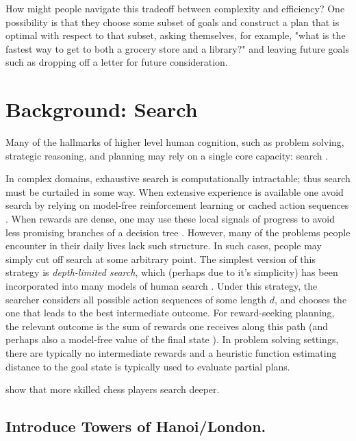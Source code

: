 \documentclass[10pt,letterpaper]{article}
\begin{document}
How might people navigate this tradeoff between complexity and efficiency? One possibility is that they choose some subset of goals and construct a plan that is optimal with respect to that subset, asking themselves, for example, "what is the fastest way to get to both a grocery store and a library?" and leaving future goals such as dropping off a letter for future consideration.




\section{Background: Search}

Many of the hallmarks of higher level human cognition, such as problem solving, strategic reasoning, and planning may rely on a single core capacity: search \cite{NewellSimon1972}.

In complex domains, exhaustive search is computationally intractable; thus search must be curtailed in some way. When extensive experience is available one avoid search by relying on model-free reinforcement learning \citep{Kool2017} or cached action sequences \citep{Huys2015}. When rewards are dense, one may use these local signals of progress to avoid less promising branches of a decision tree \citep{Huys2012}. However, many of the problems people encounter in their daily lives lack such structure. In such cases, people may simply cut off search at some arbitrary point. The simplest version of this strategy is \textit{depth-limited search}, which (perhaps due to it's simplicity) has been incorporated into many models of human search \citep{MacGregor2001,Keramati2016,Krusche2018}. Under this strategy, the searcher considers all possible action sequences of some length $d$, and chooses the one that leads to the best intermediate outcome. For reward-seeking planning, the relevant outcome is the sum of rewards one receives along this path (and perhaps also a model-free value of the final state \citep{Keramati2016}). In problem solving settings, there are typically no intermediate rewards and a heuristic function estimating distance to the goal state is typically used to evaluate partial plans.

\citet{Campitelli2004} show that more skilled chess players search deeper.





\subsection{Introduce Towers of Hanoi/London.}
\end{document}
